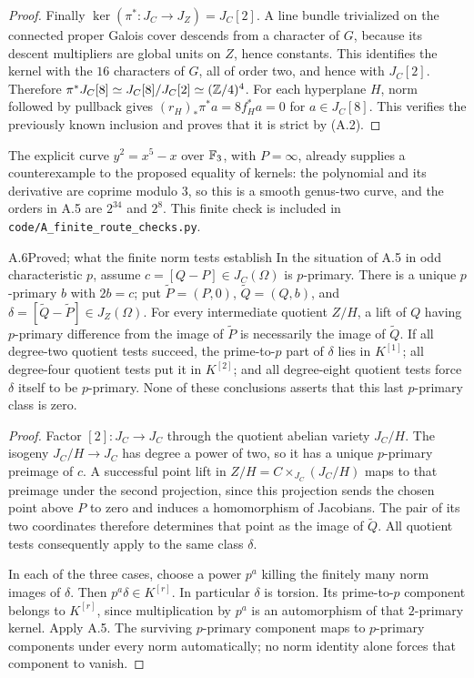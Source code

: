\begin{proof}
Finally $\ker(\pi^*:J_C\to J_Z)=J_C[2]$.
A line bundle trivialized on the connected proper Galois cover
descends from a character of $G$, because its descent multipliers
are global units on $Z$, hence constants. This identifies the
kernel with the $16$ characters of $G$, all of order two, and hence
with $J_C[2]$. Therefore
$\pi^*J_C[8]\simeq J_C[8]/J_C[2]\simeq(\mathbb Z/4)^4$.
For each hyperplane $H$, norm followed by pullback gives
$(r_H)_*\pi^*a=8f_H^*a=0$ for $a\in J_C[8]$.
This verifies the previously known inclusion and proves that it
is strict by (A.2).
\end{proof}

The explicit curve $y^2=x^5-x$ over $\mathbb F_3$, with $P=\infty$,
already supplies a counterexample to the proposed equality of
kernels: the polynomial and its derivative are coprime modulo $3$,
so this is a smooth genus-two curve, and the orders in A.5 are
$2^{34}$ and $2^8$. This finite check is included in
\texttt{code/A\_finite\_route\_checks.py}.

\begin{claim}{A.6}{Proved; what the finite norm tests establish}
In the situation of A.5 in odd characteristic $p$, assume
$c=[Q-P]\in J_C(\Omega)$ is $p$-primary. There is a unique
$p$-primary $b$ with $2b=c$; put
$\widetilde P=(P,0)$, $\widetilde Q=(Q,b)$, and
$\delta=[\widetilde Q-\widetilde P]\in J_Z(\Omega)$.
For every intermediate quotient $Z/H$, a lift of $Q$ having
$p$-primary difference from the image of $\widetilde P$ is
necessarily the image of $\widetilde Q$.
If all degree-two quotient tests succeed, the prime-to-$p$ part
of $\delta$ lies in $K^{[1]}$; all degree-four quotient tests
put it in $K^{[2]}$; and all degree-eight quotient tests force
$\delta$ itself to be $p$-primary. None of these conclusions
asserts that this last $p$-primary class is zero.
\end{claim}
\begin{proof}
Factor $[2]:J_C\to J_C$ through the quotient abelian variety
$J_C/H$. The isogeny $J_C/H\to J_C$ has degree a power of two,
so it has a unique $p$-primary preimage of $c$. A successful point
lift in $Z/H=C\times_{J_C}(J_C/H)$ maps to that preimage under
the second projection, since this projection sends the chosen
point above $P$ to zero and induces a homomorphism of Jacobians.
The pair of its two coordinates therefore determines that point
as the image of $\widetilde Q$. All quotient tests consequently
apply to the same class $\delta$.

In each of the three cases, choose a power $p^a$ killing the
finitely many norm images of $\delta$. Then
$p^a\delta\in K^{[r]}$. In particular $\delta$ is torsion.
Its prime-to-$p$ component belongs to $K^{[r]}$, since multiplication
by $p^a$ is an automorphism of that $2$-primary kernel. Apply A.5.
The surviving $p$-primary component maps to $p$-primary components
under every norm automatically; no norm identity alone forces
that component to vanish.
\end{proof}


